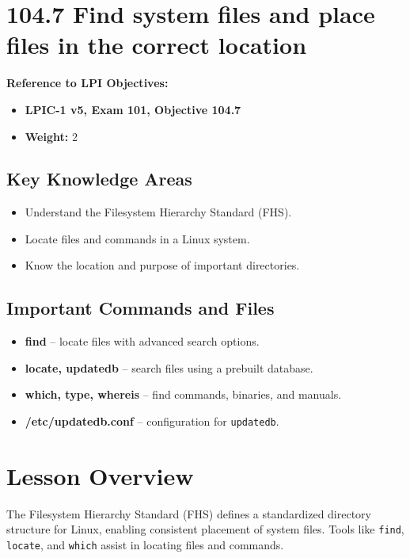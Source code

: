 \documentclass[a4paper]{report}
\begin{document}
\section*{104.7 Find system files and place files in the correct location}

\textbf{Reference to LPI Objectives:}
\begin{itemize}
    \item \textbf{LPIC-1 v5, Exam 101, Objective 104.7}
    \item \textbf{Weight:} 2
\end{itemize}

\subsection*{Key Knowledge Areas}
\begin{itemize}
    \item Understand the Filesystem Hierarchy Standard (FHS).
    \item Locate files and commands in a Linux system.
    \item Know the location and purpose of important directories.
\end{itemize}

\subsection*{Important Commands and Files}
\begin{itemize}
    \item \textbf{find} -- locate files with advanced search options.
    \item \textbf{locate, updatedb} -- search files using a prebuilt database.
    \item \textbf{which, type, whereis} -- find commands, binaries, and manuals.
    \item \textbf{/etc/updatedb.conf} -- configuration for \texttt{updatedb}.
\end{itemize}

\section*{Lesson Overview}

The Filesystem Hierarchy Standard (FHS) defines a standardized directory structure for Linux, enabling consistent placement of system files. Tools like \texttt{find}, \texttt{locate}, and \texttt{which} assist in locating files and commands.
\end{document}
